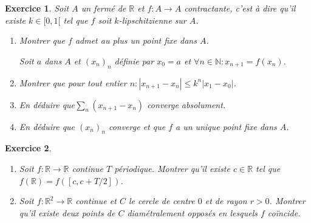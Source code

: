 \documentclass[12pt,a4paper]{article}
\newcommand{\R}{\mathbb{R}}
\newcommand{\N}{\mathbb{N}}
\theoremstyle{break}
\theoremstyle{break}
\newtheorem{Exo}{Exercice}
\begin{document}
\begin{Exo}
	Soit $A$ un fermé de $\R$ et $f:A\to A$ contractante, c'est à dire qu'il existe $k\in[0,1[$ tel que $f$ soit  $k$-lipschitzienne sur $A$.
	\begin{enumerate}
		\item
		Montrer que $f$ admet au plus un point fixe dans $A$.
		
		Soit $a$ dans $A$ et $(x_n)_n$ définie par $x_0=a$ et $\forall n\in\N:x_{n+1}=f(x_n)$.
		\item
		Montrer que pour tout entier $n:|x_{n+1}-x_n|\leqslant k^n|x_1-x_0|$. 
		\item
		En déduire que$\sum_n(x_{n+1}-x_n)$ converge absolument.
		\item
		En déduire que $(x_n)_n$ converge et que $f$ a un unique point fixe dans $A$.
	\end{enumerate}

\end{Exo}

\begin{Exo}\ 
\begin{enumerate}
	\item
	Soit $f:\R\to\R$ continue $T$ périodique. Montrer qu'il existe $c\in\R$ tel que $f(\R)=f([c,c+T/2])$.
	\item
	Soit $f:\R^2\to \R$ continue et $C$ le cercle de centre $0$ et de rayon $r>0$. Montrer qu'il existe deux points de $C$ diamétralement opposés en lesquels $f$ coïncide.
\end{enumerate}
\end{Exo}
\end{document}
